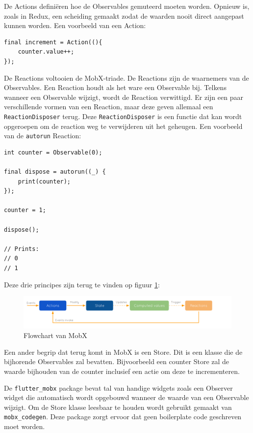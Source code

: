 De Actions definiëren hoe de Observables gemuteerd moeten worden. Opnieuw is, zoals in Redux, een scheiding gemaakt zodat de waarden nooit direct aangepast kunnen worden.
Een voorbeeld van een Action:
\begin{verbatim}
final increment = Action((){
    counter.value++;
});    
\end{verbatim}

De Reactions voltooien de MobX-triade. De Reactions zijn de waarnemers van de Observables. Een Reaction houdt als het ware een Observable bij. Telkens wanneer een Observable wijzigt, wordt de Reaction verwittigd. Er zijn een paar verschillende vormen van een Reaction, maar deze geven allemaal een \verb|ReactionDisposer| terug. Deze \verb|ReactionDisposer| is een functie dat kan wordt opgeroepen om de reaction weg te verwijderen uit het geheugen. Een voorbeeld van de \verb|autorun| Reaction:
\begin{verbatim}
int counter = Observable(0);

final dispose = autorun((_) {
    print(counter);
});

counter = 1;

dispose();

// Prints:
// 0
// 1
\end{verbatim}

Deze drie principes zijn terug te vinden op figuur \ref{fig:mobx-principles}:

\begin{figure}[H]
    \centering
    \includegraphics[width=\linewidth]{img/stand-van-zaken/mobx-principles.png}
    \caption{Flowchart van MobX \autocite{MobX2019}}
    \label{fig:mobx-principles}
\end{figure}

Een ander begrip dat terug komt in MobX is een Store. Dit is een klasse die de bijhorende Observables zal bevatten. Bijvoorbeeld een counter Store zal de waarde bijhouden van de counter inclusief een actie om deze te incrementeren.

De  \verb|flutter_mobx| package bevat tal van handige widgets zoals een Observer widget die automatisch wordt opgebouwd wanneer de waarde van een Observable wijzigt. 
Om de Store klasse leesbaar te houden wordt gebruikt gemaakt van \verb|mobx_codegen|. Deze package zorgt ervoor dat geen boilerplate code geschreven moet worden. 
